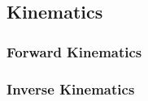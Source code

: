 \subsection{Kinematics}
\label{sec::314_k}
\subsubsection{Forward Kinematics}
\label{sec::3141_fk}
\subsubsection{Inverse Kinematics}
\label{sec::3142_ik}